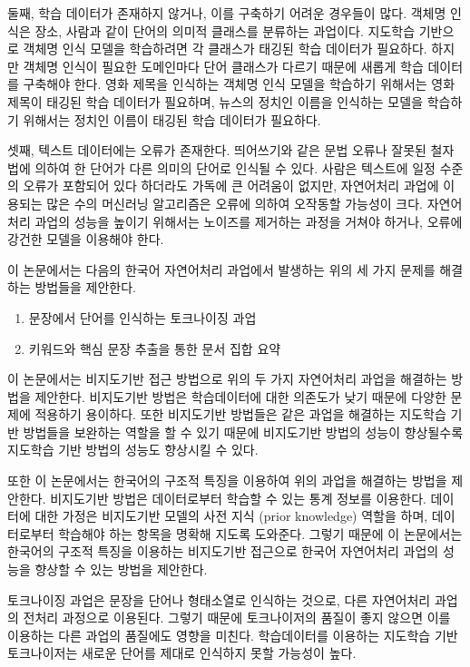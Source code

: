 \documentclass[11pt]{article}
\begin{document}
둘째, 학습 데이터가 존재하지 않거나, 이를 구축하기 어려운 경우들이 많다.
객체명 인식은 장소, 사람과 같이 단어의 의미적 클래스를 분류하는 과업이다.
지도학습 기반으로 객체명 인식 모델을 학습하려면 각 클래스가 태깅된 학습 데이터가 필요하다.
하지만 객체명 인식이 필요한 도메인마다 단어 클래스가 다르기 때문에 새롭게 학습 데이터를 구축해야 한다.
영화 제목을 인식하는 객체명 인식 모델을 학습하기 위해서는 영화 제목이 태깅된 학습 데이터가 필요하며, 뉴스의 정치인 이름을 인식하는 모델을 학습하기 위해서는 정치인 이름이 태깅된 학습 데이터가 필요하다.

셋째, 텍스트 데이터에는 오류가 존재한다.
띄어쓰기와 같은 문법 오류나 잘못된 철자법에 의하여 한 단어가 다른 의미의 단어로 인식될 수 있다.
사람은 텍스트에 일정 수준의 오류가 포함되어 있다 하더라도 가독에 큰 어려움이 없지만, 자연어처리 과업에 이용되는 많은 수의 머신러닝 알고리즘은 오류에 의하여 오작동할 가능성이 크다.
자연어처리 과업의 성능을 높이기 위해서는 노이즈를 제거하는 과정을 거쳐야 하거나, 오류에 강건한 모델을 이용해야 한다.

이 논문에서는 다음의 한국어 자연어처리 과업에서 발생하는 위의 세 가지 문제를 해결하는 방법들을 제안한다.

\begin{enumerate}[noitemsep]
    \item 문장에서 단어를 인식하는 토크나이징 과업
    \item 키워드와 핵심 문장 추출을 통한 문서 집합 요약
\end{enumerate}

이 논문에서는 비지도기반 접근 방법으로 위의 두 가지 자연어처리 과업을 해결하는 방법을 제안한다.
비지도기반 방법은 학습데이터에 대한 의존도가 낮기 때문에 다양한 문제에 적용하기 용이하다.
또한 비지도기반 방법들은 같은 과업을 해결하는 지도학습 기반 방법들을 보완하는 역할을 할 수 있기 때문에 비지도기반 방법의 성능이 향상될수록 지도학습 기반 방법의 성능도 향상시킬 수 있다.

또한 이 논문에서는 한국어의 구조적 특징을 이용하여 위의 과업을 해결하는 방법을 제안한다.
비지도기반 방법은 데이터로부터 학습할 수 있는 통계 정보를 이용한다.
데이터에 대한 가정은 비지도기반 모델의 사전 지식 (prior knowledge) 역할을 하며, 데이터로부터 학습해야 하는 항목을 명확해 지도록 도와준다.
그렇기 때문에 이 논문에서는 한국어의 구조적 특징을 이용하는 비지도기반 접근으로 한국어 자연어처리 과업의 성능을 향상할 수 있는 방법을 제안한다.

토크나이징 과업은 문장을 단어나 형태소열로 인식하는 것으로, 다른 자연어처리 과업의 전처리 과정으로 이용된다.
그렇기 때문에 토크나이저의 품질이 좋지 않으면 이를 이용하는 다른 과업의 품질에도 영향을 미친다.
학습데이터를 이용하는 지도학습 기반 토크나이저는 새로운 단어를 제대로 인식하지 못할 가능성이 높다.
\end{document}
